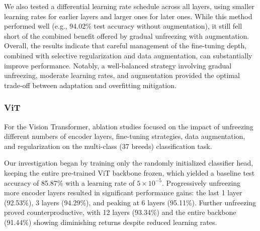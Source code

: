 \documentclass{article}
\begin{document}
We also tested a differential learning rate schedule across all layers, using smaller learning rates for earlier layers and larger ones for later ones. While this method performed well (e.g., 94.02\% test accuracy without augmentation), it still fell short of the combined benefit offered by gradual unfreezing with augmentation. Overall, the results indicate that careful management of the fine-tuning depth, combined with selective regularization and data augmentation, can substantially improve performance. Notably, a well-balanced strategy involving gradual unfreezing, moderate learning rates, and augmentation provided the optimal trade-off between adaptation and overfitting mitigation.



\subsubsection{ViT}
For the Vision Transformer, ablation studies focused on the impact of unfreezing different numbers of encoder layers, fine-tuning strategies, data augmentation, and regularization on the multi-class (37 breeds) classification task.

Our investigation began by training only the randomly initialized classifier head, keeping the entire pre-trained ViT backbone frozen, which yielded a baseline test accuracy of 85.87\% with a learning rate of $5 \times 10^{-5}$. Progressively unfreezing more encoder layers resulted in significant performance gains: the last 1 layer (92.53\%), 3 layers (94.29\%), and peaking at 6 layers (95.11\%). Further unfreezing proved counterproductive, with 12 layers (93.34\%) and the entire backbone (91.44\%) showing diminishing returns despite reduced learning rates.
\end{document}
